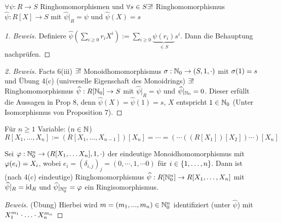 \documentclass[a4paper]{report}
\begin{document}
\begin{prop} $\forall \psi : R \to S$ Ringhomomorphismen und $\forall s \in S \exists !$ Ringhomomorphismus $\hat \psi : R[X] \to S$ mit $\hat \psi|_{R} = \psi$ und $\hat \psi(X) = s$
\begin{proof}[1. Beweis]
  Definiere $\hat\psi(\sum_{i \ge 0}r_{i}X^{i}) := \sum_{i \ge 0}\underbrace{\psi(r_{i})}_{\in S}s^{i}$. Dann die Behauptung nachprüfen.
\end{proof}
\begin{proof}[2. Beweis]
  Facts 6(iii) $\exists !$ Monoidhomomorphismus $\sigma : \mathbb{N}_0 \to (S, 1, \cdot)$ mit $\sigma(1) = s$ und Übung 4(c) (universelle Eigenschaft des Monoidrings) $\exists !$ Ringhomomorphismus $\widehat \psi : R[\mathbb{N}_0] \to S$ mit $\hat \psi|_{R} = \psi$ und $\widehat\psi|_{\mathbb{N}_0} = 0$. Dieser erfüllt die Aussagen in Prop 8, denn $\hat \psi(X) = \hat \psi(1) = s$, $X$ entspricht $1 \in \mathbb{N}_0 $ (Unter Isomorphismus von Proposition 7).
\end{proof}
\end{prop}
\begin{defi*}
  Für $n \ge 1$ Variable: ($n \in \mathbb{N}$)
  \[R[X_{1}, \ldots, X_{n}] := (R[X_{1}, \ldots, X_{n-1}])[X_{n}] = \cdots = (\cdots((R[X_{1}])[X_{2}]) \cdots)[X_{n}]\]
\end{defi*}
\begin{satz}
  Sei $\varphi : \mathbb{N}_0^{n} \to (R[X_{1}, \ldots X_{n}], 1, \cdot)$ der eindeutige Monoidhomomorphismus mit $\varphi(e_{i}) = X_{i}$, wobei $e_{i} = (\delta_{i,j})_{j} = (0, \cdots, 1, \cdots 0)$ für $i \in \{1, \ldots, n\}$. Dann ist (nach 4(c) eindeutige) Ringhomomorphismus $\widehat \psi : R[\mathbb{N}_0^{n}] \to R[X_{1}, \ldots, X_{n}]$ mit $\widehat \psi|_{R} = \operatorname{id}_{R}$ und $\widehat \psi|_{\mathbb{N}_0^{n}} = \varphi$ ein Ringisomorphismus.
  \begin{proof}[Beweis]
    (Übung) Hierbei wird $m = (m_{1}, ..., m_{n}) \in \mathbb{N}_0^{n}$ identifiziert (unter $\hat \psi$) mit $X_{1}^{m_{1}}\cdot \ldots \cdot X_{n}^{m_{n}}$
  \end{proof}
\end{satz}
\end{document}
